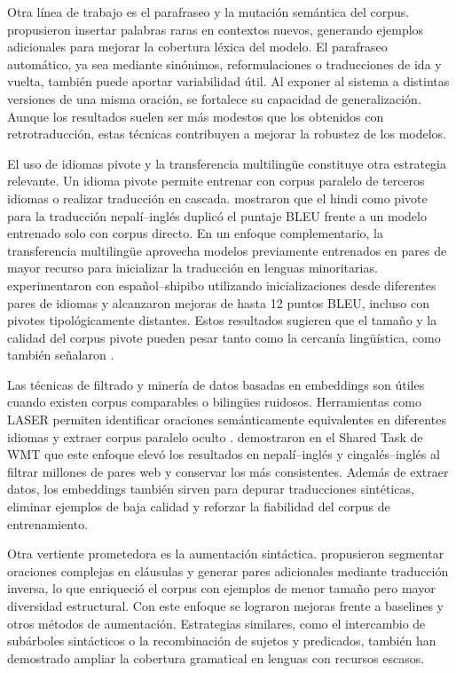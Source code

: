\documentclass[12pt,a4paper,oneside]{book}
\begin{document}
Otra línea de trabajo es el parafraseo y la mutación semántica del corpus. \textcite{fadaee2017} propusieron insertar palabras raras en contextos nuevos, generando ejemplos adicionales para mejorar la cobertura léxica del modelo. El parafraseo automático, ya sea mediante sinónimos, reformulaciones o traducciones de ida y vuelta, también puede aportar variabilidad útil. Al exponer al sistema a distintas versiones de una misma oración, se fortalece su capacidad de generalización. Aunque los resultados suelen ser más modestos que los obtenidos con retrotraducción, estas técnicas contribuyen a mejorar la robustez de los modelos.

El uso de idiomas pivote y la transferencia multilingüe constituye otra estrategia relevante. Un idioma pivote permite entrenar con corpus paralelo de terceros idiomas o realizar traducción en cascada. \textcite{talwar2025} mostraron que el hindi como pivote para la traducción nepalí--inglés duplicó el puntaje BLEU frente a un modelo entrenado solo con corpus directo. En un enfoque complementario, la transferencia multilingüe aprovecha modelos previamente entrenados en pares de mayor recurso para inicializar la traducción en lenguas minoritarias. \textcite{montoya2019} experimentaron con español--shipibo utilizando inicializaciones desde diferentes pares de idiomas y alcanzaron mejoras de hasta 12 puntos BLEU, incluso con pivotes tipológicamente distantes. Estos resultados sugieren que el tamaño y la calidad del corpus pivote pueden pesar tanto como la cercanía lingüística, como también señalaron \textcite{kocmi2018}.

Las técnicas de filtrado y minería de datos basadas en embeddings son útiles cuando existen corpus comparables o bilingües ruidosos. Herramientas como LASER permiten identificar oraciones semánticamente equivalentes en diferentes idiomas y extraer corpus paralelo oculto \parencite{artetxe2019}. \textcite{chaudhary2019} demostraron en el Shared Task de WMT que este enfoque elevó los resultados en nepalí--inglés y cingalés--inglés al filtrar millones de pares web y conservar los más consistentes. Además de extraer datos, los embeddings también sirven para depurar traducciones sintéticas, eliminar ejemplos de baja calidad y reforzar la fiabilidad del corpus de entrenamiento.

Otra vertiente prometedora es la aumentación sintáctica. \textcite{li2025clause} propusieron segmentar oraciones complejas en cláusulas y generar pares adicionales mediante traducción inversa, lo que enriqueció el corpus con ejemplos de menor tamaño pero mayor diversidad estructural. Con este enfoque se lograron mejoras frente a baselines y otros métodos de aumentación. Estrategias similares, como el intercambio de subárboles sintácticos o la recombinación de sujetos y predicados, también han demostrado ampliar la cobertura gramatical en lenguas con recursos escasos.
\end{document}
